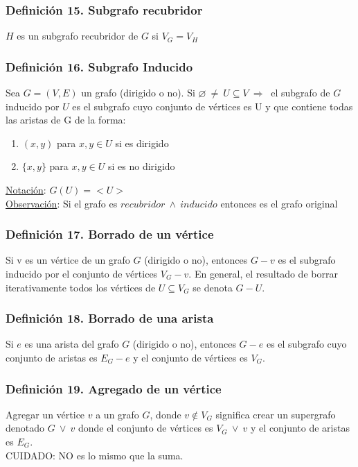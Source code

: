 \documentclass{article}
\newcommand{\lands}{\:\land\:}                          %
\newcommand{\vees}{\:\vee\:}                            %
\newcommand{\neqs}{\:\neq\:}                            %
\newcommand{\Rightarrows}{\: \Rightarrow \:}            %
\begin{document}
\subsubsection*{Definición 15. Subgrafo recubridor}
$H$ es un subgrafo recubridor de $G$ si $V_G = V_H$

\subsubsection*{Definición 16. Subgrafo Inducido}
Sea $G=(V,E)$ un grafo (dirigido o no).
Si $\varnothing \neqs U \subseteq V \Rightarrows$ el subgrafo de $G$ inducido por $U$ es el subgrafo cuyo conjunto de vértices es U y que contiene todas las aristas de G de la forma:
\begin{enumerate}
    \item $(x,y)$ para $x,y \in U$ si es dirigido
    \item $\{x,y\}$ para $x,y \in U$ si es no dirigido
\end{enumerate}
\underline{Notación}: $G(U)=<U>$
\\\underline{Observación}: Si el grafo es $recubridor \lands inducido$ entonces es el grafo original

\subsubsection*{Definición 17. Borrado de un vértice}
Si v es un vértice de un grafo $G$ (dirigido o no), entonces $G - v$ es el subgrafo inducido por el conjunto de vértices $V_G-{v}$. 
En general, el resultado de borrar iterativamente todos los vértices de $U \subseteq V_G$ se denota $G-U$.

\subsubsection*{Definición 18. Borrado de una arista}
Si $e$ es una arista del grafo $G$ (dirigido o no), entonces $G-e$ es el subgrafo cuyo conjunto de aristas es $E_G - {e}$ y el conjunto de vértices es $V_G$.

\subsubsection*{Definición 19. Agregado de un vértice}
Agregar un vértice $v$ a un grafo $G$, donde $v \notin V_G$ significa crear un supergrafo denotado $G \vees {v}$ donde el conjunto de vértices es $V_G \vees {v}$ y el conjunto de aristas es $E_G$.
\\CUIDADO: NO es lo mismo que la suma.
\end{document}
